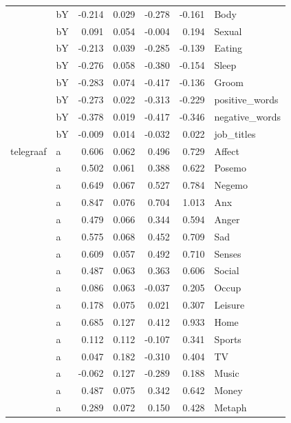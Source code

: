 \documentclass[11pt,a4paper]{article}
\begin{document}
\begin{longtable}{llrrrrl}
   & bY & -0.214 &  0.029 &   -0.278 &    -0.161 &            Body \\
   & bY &  0.091 &  0.054 &   -0.004 &     0.194 &          Sexual \\
   & bY & -0.213 &  0.039 &   -0.285 &    -0.139 &          Eating \\
   & bY & -0.276 &  0.058 &   -0.380 &    -0.154 &           Sleep \\
   & bY & -0.283 &  0.074 &   -0.417 &    -0.136 &           Groom \\
   & bY & -0.273 &  0.022 &   -0.313 &    -0.229 &  positive\_words \\
   & bY & -0.378 &  0.019 &   -0.417 &    -0.346 &  negative\_words \\
   & bY & -0.009 &  0.014 &   -0.032 &     0.022 &      job\_titles \\
telegraaf & a &  0.606 &  0.062 &    0.496 &     0.729 &          Affect \\
   & a &  0.502 &  0.061 &    0.388 &     0.622 &          Posemo \\
   & a &  0.649 &  0.067 &    0.527 &     0.784 &          Negemo \\
   & a &  0.847 &  0.076 &    0.704 &     1.013 &             Anx \\
   & a &  0.479 &  0.066 &    0.344 &     0.594 &           Anger \\
   & a &  0.575 &  0.068 &    0.452 &     0.709 &             Sad \\
   & a &  0.609 &  0.057 &    0.492 &     0.710 &          Senses \\
   & a &  0.487 &  0.063 &    0.363 &     0.606 &          Social \\
   & a &  0.086 &  0.063 &   -0.037 &     0.205 &           Occup \\
   & a &  0.178 &  0.075 &    0.021 &     0.307 &         Leisure \\
   & a &  0.685 &  0.127 &    0.412 &     0.933 &            Home \\
   & a &  0.112 &  0.112 &   -0.107 &     0.341 &          Sports \\
   & a &  0.047 &  0.182 &   -0.310 &     0.404 &              TV \\
   & a & -0.062 &  0.127 &   -0.289 &     0.188 &           Music \\
   & a &  0.487 &  0.075 &    0.342 &     0.642 &           Money \\
   & a &  0.289 &  0.072 &    0.150 &     0.428 &          Metaph \\

\end{longtable}
\end{document}
